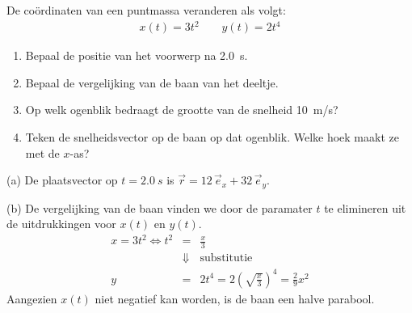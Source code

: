 
\begin{exercise}





 De co\"ordinaten van een puntmassa veranderen als volgt:
\begin{eqnarray*}
	x(t)=3t^2\qquad y(t)=2t^4
\end{eqnarray*}
\begin{enumerate}
\item Bepaal de positie van het voorwerp na \SI{2,0}{s}.%
\item Bepaal de vergelijking van de baan van het deeltje.
\item Op welk ogenblik bedraagt de grootte van de snelheid \SI{10}{m/s}?
\item Teken de snelheidsvector op de baan op dat ogenblik. Welke hoek maakt ze met de $x$-as?
\end{enumerate}

\begin{oplossing}
\item[(a)] De plaatsvector op $t=\SI{2,0}{s}$ is $\vec{r}=12\,\vec{e}_x+32\,\vec{e}_y$.
\item[(b)] De vergelijking van de baan vinden we door de paramater $t$ te elimineren uit de uitdrukkingen voor $x(t)$ en $y(t)$.
\begin{eqnarray*}
x=3t^2\Leftrightarrow t^2&=&\frac{x}{3}\\
&\Downarrow&\mathrm{substitutie}\\
y&=&2t^4=2\left(\sqrt{\frac{x}{3}}\right)^4=\frac{2}{9}x^2
\end{eqnarray*}
Aangezien $x(t)$ niet negatief kan worden, is de baan een halve parabool.


\end{oplossing}
\end{exercise}

